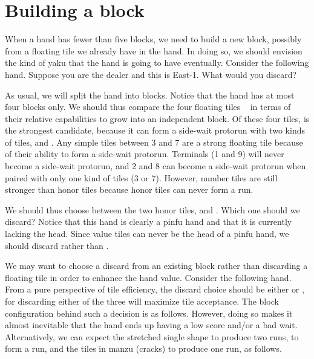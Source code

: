 \section{Building a block}

When a hand has fewer than five blocks, we need to build a new block, possibly from a floating tile we already have in the hand. In doing so, we should envision the kind of {\jap yaku} that the hand is going to have eventually. Consider the following hand. Suppose you are the dealer and this is East-1. What would you discard?

\bp
{}\zhong\bei
\ep

As usual, we will split the hand into blocks. Notice that the hand has at most four blocks only.
\emj \label{hand:head}
We should thus compare the four floating tiles {\LARGE{}  \zhong ~\bei} in terms of their relative capabilities to grow into an independent block. Of these four tiles, {\LARGE{}} is the strongest candidate, because it can form a side-wait protorun with two kinds of tiles,  and . Any simple tiles between 3 and 7 are a strong floating tile because of their ability to form a side-wait protorun. Terminals (1 and 9) will never become a side-wait protorun, and 2 and 8 can become a side-wait protorun when paired with only one kind of tiles (3 or 7). However, number tiles are still stronger than honor tiles because honor tiles can never form a run.

\bigskip
We should thus choose between the two honor tiles, {\LARGE\zhong} and {\LARGE\bei}. Which one should we discard? Notice that this hand is clearly a {\jap pinfu} hand and that it is currently lacking the head. Since value tiles can never be the head of a {\jap pinfu} hand, we should discard {\LARGE\zhong} rather than {\LARGE\bei}.

\bigskip
We may want to choose a discard from an existing block rather than discarding a floating tile in order to enhance the hand value. Consider the following hand.
\bp
{}
\ep
From a pure perspective of tile efficiency, the discard choice should be either {\LARGE{} } or {\LARGE{}}, for discarding either of the three will maximize tile acceptance. The block configuration behind such a  decision is as follows.
\emj
However, doing so makes it almost inevitable that the hand ends up having a low score and/or a bad wait. Alternatively, we can expect the stretched single shape {\LARGE{}} to produce two runs, {\LARGE{}} to form a run, and the tiles in {\jap manzu} (cracks) to produce one run, as follows.

